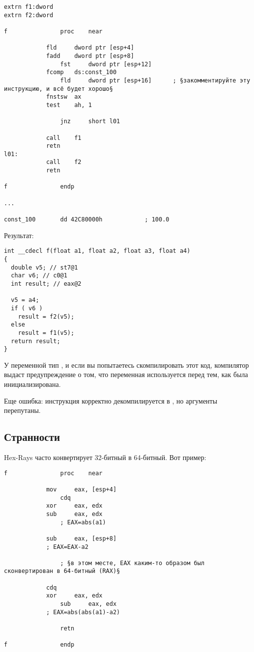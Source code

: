 \begin{lstlisting}
extrn f1:dword
extrn f2:dword

f               proc    near

	        fld     dword ptr [esp+4]
        	fadd    dword ptr [esp+8]
                fst     dword ptr [esp+12]
	        fcomp   ds:const_100
                fld     dword ptr [esp+16]      ; §закомментируйте эту инструкцию, и всё будет хорошо§
	        fnstsw  ax
        	test    ah, 1

                jnz     short l01

	        call    f1
        	retn
l01:
	        call    f2
        	retn

f               endp

...

const_100       dd 42C80000h            ; 100.0
\end{lstlisting}

Результат:

\begin{lstlisting}
int __cdecl f(float a1, float a2, float a3, float a4)
{
  double v5; // st7@1
  char v6; // c0@1
  int result; // eax@2

  v5 = a4;
  if ( v6 )
    result = f2(v5);
  else
    result = f1(v5);
  return result;
}
\end{lstlisting}

У переменной  тип , и если вы попытаетесь скомпилировать этот код, компилятор выдаст предупреждение о том,
что переменная используется перед тем, как была инициализирована.

Еще ошибка: инструкция  корректно декомпилируется в , но аргументы перепутаны.

\subsection{Странности}

Hex-Rays часто конвертирует 32-битный  в 64-битный.
Вот пример:

\begin{lstlisting}
f               proc    near

	        mov     eax, [esp+4]
                cdq
	        xor     eax, edx
        	sub     eax, edx
                ; EAX=abs(a1)

	        sub     eax, [esp+8]
        	; EAX=EAX-a2

                ; §в этом месте, EAX каким-то образом был сконвертирован в 64-битный (RAX)§

	        cdq
        	xor     eax, edx
                sub     eax, edx
	        ; EAX=abs(abs(a1)-a2)

                retn

f               endp
\end{lstlisting}

